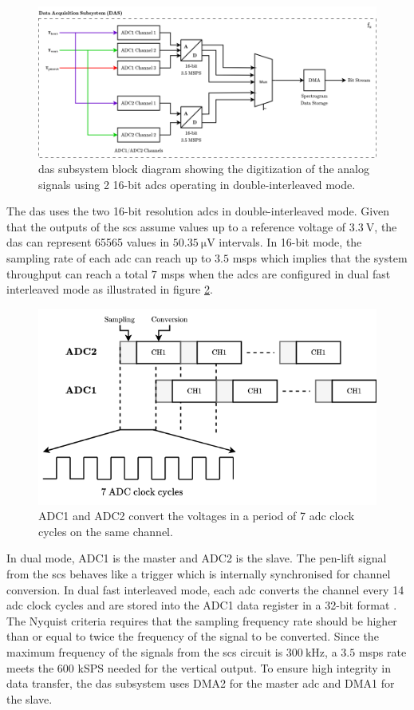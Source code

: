 \documentclass[class=report,11pt,crop=false]{standalone}
\begin{document}
	\begin{figure}[h!]
		\centering
		\includegraphics[width=0.7\linewidth]{Figures/Methodology/das-subsystem-diagram}
		\caption{\acrshort{das} subsystem block diagram showing the digitization of the analog signals using 2 16-bit \acrshort{adc}s operating in double-interleaved mode.}
		\label{fig:das-subsystem-diagram}
	\end{figure} 
	
	The \acrshort{das} uses the two 16-bit resolution \acrshort{adc}s in double-interleaved mode. Given that the outputs of the \acrshort{scs} assume values up to a reference voltage of $\SI{3.3}{\volt}$, the \acrshort{das} can represent 65565 values in $\SI{50.35}{\micro\volt}$ intervals. In 16-bit mode, the sampling rate of each \acrshort{adc} can reach up to $3.5$ \acrshort{msps} which implies that the system throughput can reach a total $7$ \acrshort{msps} when the \acrshort{adc}s are configured in dual fast interleaved mode as illustrated in figure \ref{fig:das-adc-df-interleaved-mode}. 
	
	\begin{figure}[h!]
		\centering
		\includegraphics[width=0.55\linewidth]{Figures/Methodology/das-adc-df-interleaved-mode}
		\caption{ADC1 and ADC2 convert the voltages in a period of 7 \acrshort{adc} clock cycles on the same channel.}
		\label{fig:das-adc-df-interleaved-mode}
	\end{figure} 
	
	In dual mode, ADC1 is the master and ADC2 is the slave. The pen-lift signal from the \acrshort{scs} behaves like a trigger which is internally synchronised for channel conversion. In dual fast interleaved mode, each \acrshort{adc} converts the channel every 14 \acrshort{adc} clock cycles and are stored into the ADC1 data register in a 32-bit format \cite{stm32adcmodes}. The Nyquist criteria requires that the sampling frequency rate should be higher than or equal to twice the frequency of the signal to be converted. Since the maximum frequency of the signals from the \acrshort{scs} circuit is $\SI{300}{\kilo\hertz}$, a $3.5$ \acrshort{msps} rate meets the $600$ kSPS needed for the vertical output. To ensure high integrity in data transfer, the \acrfull{das} subsystem uses DMA2 for the master \acrshort{adc} and DMA1 for the slave. 
	
\end{document}
